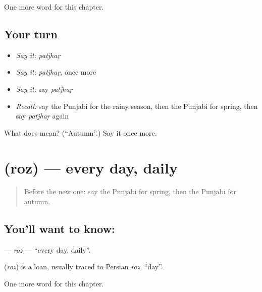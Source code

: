\begin{grammarlens}[title={What you've built}]
One more word for this chapter.
\end{grammarlens}

\subsection*{Your turn}
\begin{itemize}
\raggedright
  \item \emph{Say it:} \emph{patjhaṛ}
  \item \emph{Say it:} \emph{patjhaṛ}, once more
  \item \emph{Say it:} say \emph{patjhaṛ}
  \item \emph{Recall:} say the Punjabi for the rainy season, then the Punjabi for spring, then say \emph{patjhaṛ} again
\end{itemize}

\begin{tcolorbox}[breakable,colback=teal!4,colframe=teal!35!black,title={Before you move on}]
What does  mean? (\textquotedblleft{}Autumn\textquotedblright{}.) Say it once more.
\end{tcolorbox}
\section[\texorpdfstring{\pa{ਰੋਜ਼} (roz)}{ਰੋਜ਼ (roz)}]{ (roz) — every day, daily}

\label{lesson:PA-C100-roz}



\begin{quote}
Before the new one: say the Punjabi for spring, then the Punjabi for autumn.
\end{quote}

\subsection*{You'll want to know: }
\textbf{} — \emph{roz} — \textquotedblleft{}every day, daily\textquotedblright{}.

\begin{cousinweb}
\textbf{} (\emph{roz}) is a loan, usually traced to Persian \emph{rōz}, \textquotedblleft{}day\textquotedblright{}.
\end{cousinweb}

\begin{grammarlens}[title={What you've built}]
One more word for this chapter.
\end{grammarlens}

